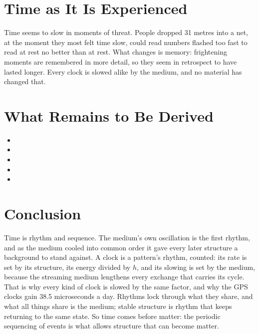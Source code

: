 \documentclass[11pt,a4paper]{article}
\begin{document}
\section{Time as It Is Experienced}
\label{sec:experienced}

Time seems to slow in moments of threat.  People dropped 31 metres into a net, at the moment they most felt time slow, could read numbers flashed too fast to read at rest no better than at rest. What changes is memory: frightening moments are remembered in more detail, so they seem in retrospect to have lasted longer.  Every clock is slowed alike by the medium, and no material has changed that.

\section{What Remains to Be Derived}
\label{sec:owed}

\begin{itemize}
\item {}
\item {}
\item {}
\item {}
\item {}
\end{itemize}

\section*{Conclusion}

Time is rhythm and sequence. The medium's own oscillation is the first rhythm, and as the medium cooled into common order it gave every later structure a background to stand against. A clock is a pattern's rhythm, counted: its rate is set by its structure, its energy divided by $h$, and its slowing is set by the medium, because the streaming medium lengthens every exchange that carries its cycle. That is why every kind of clock is slowed by the same factor, and why the GPS clocks gain 38.5 microseconds a day. Rhythms lock through what they share, and what all things share is the medium; stable structure is rhythm that keeps returning to the same state. So time comes before matter: the periodic sequencing of events is what allows structure that can become matter.
\end{document}
